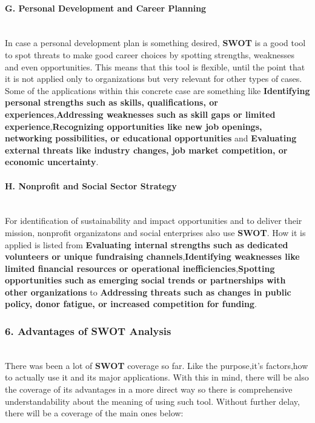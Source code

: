 \paragraph{G. Personal Development and Career Planning}\mbox{}\\
In case a personal development plan is something desired, \textbf{SWOT} is a good tool to spot threats to make good career choices by spotting strengths, weaknesses and even opportunities. This means that this tool is flexible, until the point that it is not applied only to organizations but very relevant for other types of cases. Some of the applications within this concrete case are something like \textbf{Identifying personal strengths such as skills, qualifications, or experiences},\textbf{Addressing weaknesses such as skill gaps or limited experience},\textbf{Recognizing opportunities like new job openings, networking possibilities, or educational opportunities} and \textbf{Evaluating external threats like industry changes, job market competition, or economic uncertainty}.

\paragraph{H. Nonprofit and Social Sector Strategy}\mbox{}\\
For identification of sustainability and impact opportunities and to deliver their mission, nonprofit organizatons and social enterprises also use \textbf{SWOT}. How it is applied is listed from \textbf{Evaluating internal strengths such as dedicated volunteers or unique fundraising channels},\textbf{Identifying weaknesses like limited financial resources or operational inefficiencies},\textbf{Spotting opportunities such as emerging social trends or partnerships with other organizations} to \textbf{Addressing threats such as changes in public policy, donor fatigue, or increased competition for funding}.

\subsubsection{6. Advantages of SWOT Analysis}\mbox{}\\
There was been a lot of \textbf{SWOT} coverage so far. Like the purpose,it's factors,how to actually use it and its major applications. With this in mind, there will be also the coverage of its advantages in a more direct way so there is comprehensive understandability about the meaning of using such tool. Without further delay, there will be a coverage of the main ones below:

